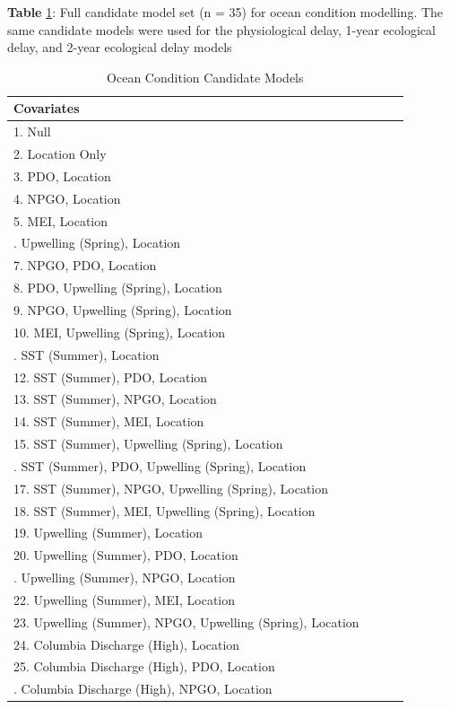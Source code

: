\documentclass [11pt, proquest] {uwthesis}[2015/03/03]
\begin{document}
\textbf{Table} \ref{tab:ocmod}: Full candidate model set (n = 35) for
ocean condition modelling. The same candidate models were used for the
physiological delay, 1-year ecological delay, and 2-year ecological
delay models

\begingroup\fontsize{8}{10}\selectfont
\begin{longtable}[t]{l>{}p{7em}>{}p{7em}>{}p{7em}}
\caption{\label{tab:ocmod}Ocean Condition Candidate Models}\\
\toprule
Covariates\\
\midrule
1. Null\\
2. Location Only\\
3. PDO, Location\\
4. NPGO, Location\\
5. MEI, Location\\
\addlinespace
6. Upwelling (Spring), Location\\
7. NPGO, PDO, Location\\
8. PDO, Upwelling (Spring), Location\\
9. NPGO, Upwelling (Spring), Location\\
10. MEI, Upwelling (Spring), Location\\
\addlinespace
11. SST (Summer), Location\\
12. SST (Summer), PDO, Location\\
13. SST (Summer), NPGO, Location\\
14. SST (Summer), MEI, Location\\
15. SST (Summer), Upwelling (Spring), Location\\
\addlinespace
16. SST (Summer), PDO, Upwelling (Spring), Location\\
17. SST (Summer), NPGO, Upwelling (Spring), Location\\
18. SST (Summer), MEI, Upwelling (Spring), Location\\
19. Upwelling (Summer), Location\\
20. Upwelling (Summer), PDO, Location\\
\addlinespace
21. Upwelling (Summer), NPGO, Location\\
22. Upwelling (Summer), MEI, Location\\
23. Upwelling (Summer), NPGO, Upwelling (Spring), Location\\
24. Columbia Discharge (High), Location\\
25. Columbia Discharge (High), PDO, Location\\
\addlinespace
26. Columbia Discharge (High), NPGO, Location\\

\end{longtable}
\end{document}

